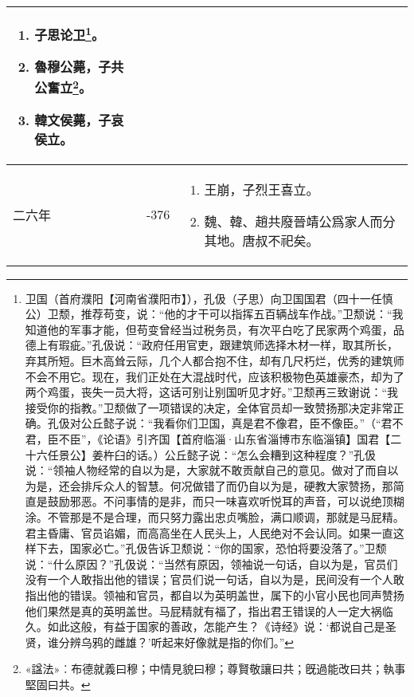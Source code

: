 \begin{longtable}{|>{\centering\scriptsize}m{2em}|>{\centering\scriptsize}m{1.3em}|>{\centering}m{8.8em}|}
\begin{enumerate}
  \item 子思论卫\footnote{卫国（首府濮阳【河南省濮阳市】），孔伋（子思）向卫国国君（四十一任慎公）卫颓，推荐苟变，说：“他的才干可以指挥五百辆战车作战。”卫颓说：“我知道他的军事才能，但苟变曾经当过税务员，有次平白吃了民家两个鸡蛋，品德上有瑕疵。”孔伋说：“政府任用官吏，跟建筑师选择木材一样，取其所长，弃其所短。巨木高耸云际，几个人都合抱不住，却有几尺朽烂，优秀的建筑师不会不用它。现在，我们正处在大混战时代，应该积极物色英雄豪杰，却为了两个鸡蛋，丧失一员大将，这话可别让别国听见才好。”卫颓再三致谢说：“我接受你的指教。”卫颓做了一项错误的决定，全体官员却一致赞扬那决定非常正确。孔伋对公丘懿子说：“我看你们卫国，真是君不像君，臣不像臣。”（“君不君，臣不臣”，《论语》引齐国【首府临淄·山东省淄博市东临淄镇】国君【二十六任景公】姜杵臼的话。）公丘懿子说：“怎么会糟到这种程度？”孔伋说：“领袖人物经常的自以为是，大家就不敢贡献自己的意见。做对了而自以为是，还会排斥众人的智慧。何况做错了而仍自以为是，硬教大家赞扬，那简直是鼓励邪恶。不问事情的是非，而只一味喜欢听悦耳的声音，可以说绝顶糊涂。不管那是不是合理，而只努力露出忠贞嘴脸，满口顺调，那就是马屁精。君主昏庸、官员谄媚，而高高坐在人民头上，人民绝对不会认同。如果一直这样下去，国家必亡。”孔伋告诉卫颓说：“你的国家，恐怕将要没落了。”卫颓说：“什么原因？”孔伋说：“当然有原因，领袖说一句话，自以为是，官员们没有一个人敢指出他的错误；官员们说一句话，自以为是，民间没有一个人敢指出他的错误。领袖和官员，都自以为英明盖世，属下的小官小民也同声赞扬他们果然是真的英明盖世。马屁精就有福了，指出君王错误的人一定大祸临久。如此这般，有益于国家的善政，怎能产生？《诗经》说：‘都说自己是圣贤，谁分辨乌鸦的雌雄？’听起来好像就是指的你们。”}。
  \item 魯穆公薨，子共公奮立\footnote{«諡法»︰布德就義曰穆；中情見貌曰穆；尊賢敬讓曰共；旣過能改曰共；執事堅固曰共。}。
  \item 韓文侯薨，子哀侯立。
  \end{enumerate} \tabularnewline\hline
  二六年 & -376 & \begin{enumerate}
    \tiny
  \item 王崩，子烈王喜立。
  \item 魏、韓、趙共廢晉靖公爲家人而分其地。唐叔不祀矣。
  \end{enumerate} \tabularnewline
  \bottomrule
\end{longtable}

